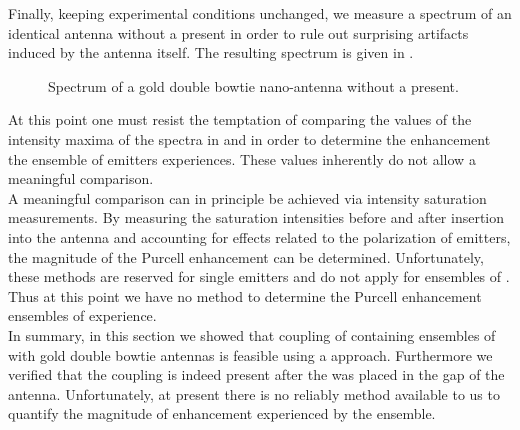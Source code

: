 			Finally, keeping experimental conditions unchanged, we measure a spectrum of an identical antenna without a \nd present in order to rule out surprising artifacts induced by the antenna itself. The resulting spectrum is given in .

				\begin{figure}[htp]
					\centering
					\caption[Spectrum of a double bowtie antenna without \nd]{Spectrum of a gold double bowtie nano-antenna without a \nd present.}
					\label{fig::spectrum_antenna_no_nd}
				\end{figure}

			At this point one must resist the temptation of comparing the values of the intensity maxima of the spectra in  and  in order to determine the enhancement the ensemble of emitters experiences. These values inherently do not allow a meaningful comparison.
			\\
			A meaningful comparison can in principle be achieved via intensity saturation measurements. By measuring the saturation intensities before and after insertion into the antenna and accounting for effects related to the polarization of emitters, the magnitude of the Purcell enhancement can be determined. Unfortunately, these methods are reserved for single emitters and do not apply for ensembles of \sivs. Thus at this point we have no method to determine the Purcell enhancement ensembles of \sivs experience.
			\\
			In summary, in this section we showed that coupling of \nds containing ensembles of \sivs with gold double bowtie antennas is feasible using a \pp approach. Furthermore we verified that the coupling is indeed present after the \nd was placed in the gap of the antenna. Unfortunately, at present there is no reliably method available to us to quantify the magnitude of \fl enhancement experienced by the \siv ensemble.

